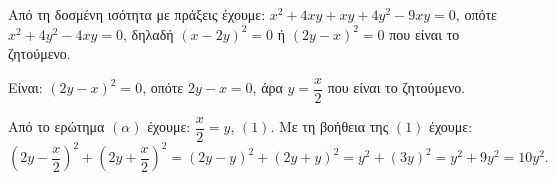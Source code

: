 
\begin{alist}
\item 
\begin{rlist}
\item Από τη δοσμένη ισότητα με πράξεις έχουμε:
$x^2 + 4xy + xy + 4y^2 - 9xy = 0$, οπότε 
$x^2 + 4y^2 - 4xy = 0$, δηλαδή $(x - 2y)^2 = 0$ ή $(2y - x)^2 = 0$ που είναι το ζητούμενο.
\item Είναι: $(2y - x)^2 = 0$, οπότε $2y - x = 0$, άρα $y = \dfrac{x}{2}$ που είναι το ζητούμενο.
\end{rlist}

\item Από το ερώτημα $(\alpha)$ έχουμε: $\dfrac{x}{2} = y$, $(1)$.
Με τη βοήθεια της $(1)$ έχουμε:
\[\left(2y - \dfrac{x}{2}\right)^2 + \left(2y + \dfrac{x}{2}\right)^2 = (2y - y)^2 + (2y + y)^2 = y^2 + (3y)^2 = y^2 + 9y^2 = 10y^2.\]
\end{alist}


